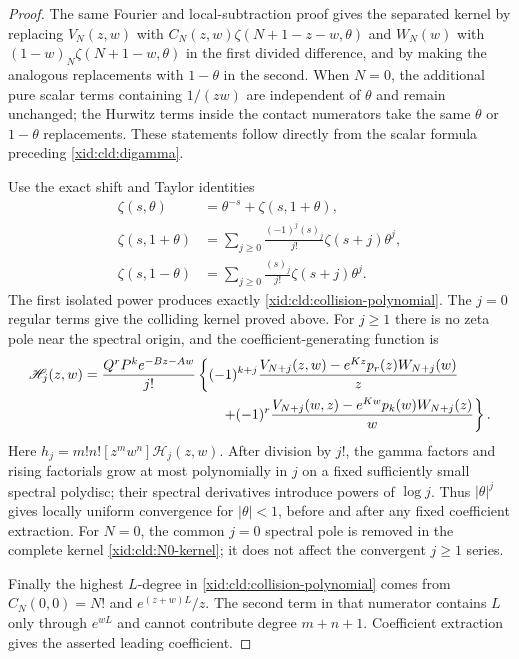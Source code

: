 \begin{proof}
The same Fourier and local-subtraction proof gives the separated kernel
by replacing $V_N(z,w)$ with
$C_N(z,w)\zeta(N+1-z-w,\theta)$ and $W_N(w)$ with
$(1-w)_N\zeta(N+1-w,\theta)$ in the first divided difference, and
by making the analogous replacements with $1-\theta$ in the second.
When $N=0$, the additional pure scalar terms containing $1/(zw)$
are independent of $\theta$ and remain unchanged; the Hurwitz terms
inside the contact numerators take the same $\theta$ or $1-\theta$
replacements. These statements follow directly from the scalar formula
preceding \eqref{xid:cld:digamma}.

Use the exact shift and Taylor identities
\begin{align*}
 \zeta(s,\theta)&=\theta^{-s}+\zeta(s,1+\theta),\\
 \zeta(s,1+\theta)&=\sum_{j\ge0}\frac{(-1)^j(s)_j}{j!}
                                      \zeta(s+j)\theta^j,\\
 \zeta(s,1-\theta)&=\sum_{j\ge0}\frac{(s)_j}{j!}
                                      \zeta(s+j)\theta^j.
\end{align*}
The first isolated power produces exactly
\eqref{xid:cld:collision-polynomial}.  The $j=0$ regular terms give the
colliding kernel proved above.  For $j\ge1$ there is no zeta pole near
the spectral origin, and the coefficient-generating function is
\begin{align}
 \mathscr H_j(z,w)
 ={}&\frac{Q^rP^ke^{-Bz-Aw}}{j!}
   \left\{(-1)^{k+j}
      \frac{V_{N+j}(z,w)-e^{Kz}p_r(z)W_{N+j}(w)}z\right.\notag\\
 &\hspace{30mm}\left.
    +(-1)^r
      \frac{V_{N+j}(w,z)-e^{Kw}p_k(w)W_{N+j}(z)}w\right\}.
 \label{xid:cld:regular-coefficients}
\end{align}
Here $h_j=m!n![z^mw^n]\mathscr H_j(z,w)$.
After division by $j!$, the gamma factors and rising factorials grow
at most polynomially in $j$ on a fixed sufficiently small spectral polydisc; their spectral
derivatives introduce powers of $\log j$.  Thus $|\theta|^j$ gives
locally uniform convergence for $|\theta|<1$, before and after any fixed
coefficient extraction.  For $N=0$, the common $j=0$ spectral pole is
removed in the complete kernel \eqref{xid:cld:N0-kernel}; it does not affect
the convergent $j\ge1$ series.

Finally the highest $L$-degree in
\eqref{xid:cld:collision-polynomial} comes from
$C_N(0,0)=N!$ and $e^{(z+w)L}/z$.  The second term in that numerator
contains $L$ only through $e^{wL}$ and cannot contribute degree
$m+n+1$.  Coefficient extraction gives the asserted leading coefficient.
\end{proof}

